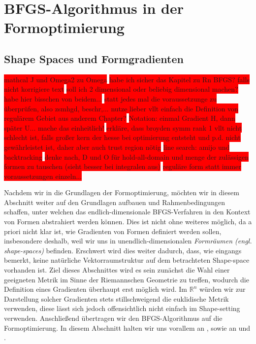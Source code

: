 
\section{BFGS-Algorithmus in der Formoptimierung}
\subsection{Shape Spaces und Formgradienten}
\label{Chap_shapespaces}

\colorbox{red}{mathcal J und Omega2 zu Omega}
\colorbox{red}{habe ich sicher das Kapitel zu Rn BFGS? falls nicht korrigiere text}
\colorbox{red}{soll ich 2 dimensional oder beliebig dimensional machen? habe hier bisschen von beidem...}
\colorbox{red}{ statt jedes mal die voraussetzunge zu überprüfen, also zsmhgd, beschr,... nutze lieber vllt einfach die Definition von regulärem Gebiet aus anderem Chapter?}
\colorbox{red}{Notation: einmal Gradient H, dann später U... mache das einheitlich!}
\colorbox{red}{erkläre, dass broyden symm rank 1 vllt nicht schlecht ist, falls großer kern der hesse bei optimierung entsteht und p.d. nicht gewährleistet ist,
daher aber auch trust region nötig}
\colorbox{red}{line search: amijo und backtracking}
\colorbox{red}{denke nach, D und O für hold-all-domain und menge der zulässigen formen zu tauschen (sieht besser bei integralen aus)}
\colorbox{red}{reguläre form statt immer voraussetzungen einzeln...}

Nachdem wir in die Grundlagen der Formoptimierung, möchten wir in diesem Abschnitt weiter auf den Grundlagen aufbauen und Rahmenbedingungen schaffen, unter welchen das endlich-dimensionale BFGS-Verfahren in den Kontext von Formen abstrahiert werden können. Dies ist nicht ohne weiteres möglich, da a priori nicht klar ist, wie Gradienten von Formen definiert werden sollen, insbesondere deshalb, weil wir uns in unendlich-dimensionalen \textit{Formräumen (engl. shape-spaces)} befinden. Erschwert wird dies weiter dadurch, dass, wie eingangs bemerkt, keine natürliche Vektorraumstruktur auf dem betrachteten Shape-space vorhanden ist. Ziel dieses Abschnittes wird es sein zunächst die Wahl einer geeigneten Metrik im Sinne der Riemannschen Geometrie zu treffen, wodurch die Definition eines Gradienten überhaupt erst möglich wird. Im $\mathbb{R}^n$ würden wir zur Darstellung solcher Gradienten stets stillschweigend die euklidische Metrik verwenden, diese lässt sich jedoch offensichtlich nicht einfach im Shape-setting verwenden. Anschließend übertragen wir den BFGS-Algorithmus auf die Formoptimierung. In diesem Abschnitt halten wir uns vorallem an \cite{bfgs2}, sowie an \cite{shape_space} und \cite{bfgs1}.


